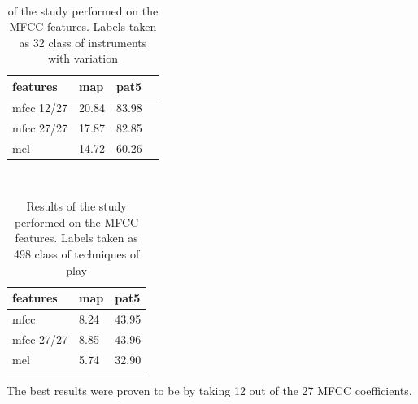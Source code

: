 \documentclass[hidelinks,12pt]{report}
\begin{document}
   
\begin{table} [H]
\begin{center} 
\ 
 \setlength{\tabcolsep}{.16667em} 
\begin{tabular}{ | l | l | l | l |}
features  & map & pat5 \\ 
\hline 
mfcc 12/27  & 20.84 & 83.98  \\ 
 
mfcc 27/27 & 17.87 & 82.85  \\ 

mel  & 14.72 & 60.26  \\ 

\end{tabular} 
\end{center} 
\caption{of the study performed on the MFCC features. Labels taken as 32 class of instruments with variation} 
\label{you} 
\end{table} 

\begin{table} [H]
\begin{center} 
\ 
 \setlength{\tabcolsep}{.16667em} 
\begin{tabular}{ | l | l | l |  }
features  & map & pat5  \\ 
\hline 
mfcc  & 8.24 & 43.95 \\ 

mfcc 27/27  & 8.85 & 43.96 \\  
mel  & 5.74 & 32.90  \\ 

\end{tabular} 
\end{center} 
\caption{Results of the study performed on the MFCC features. Labels taken as 498 class of techniques of play}  
\label{you} 
\end{table} 
The best results were proven to be by taking 12 out of the 27 MFCC coefficients.
\end{document}

